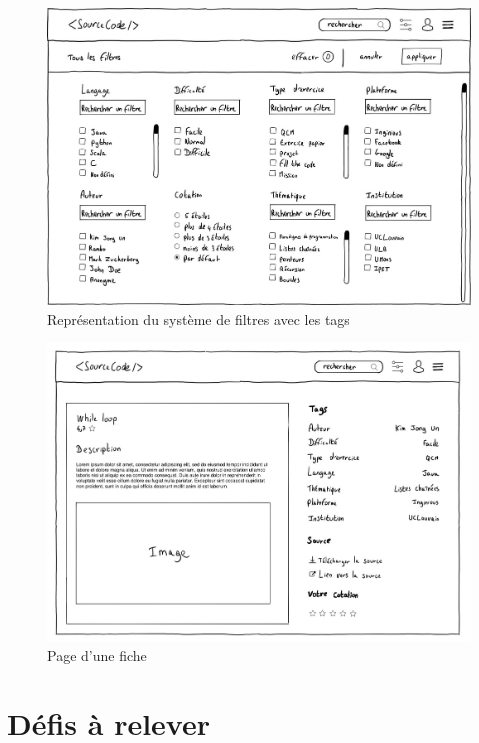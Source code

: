 \begin{figure}[H]
    \includegraphics[width=\textwidth,height=0.4\textheight,keepaspectratio]{images/filters.JPG}
    \centering
    \caption{Représentation du système de filtres avec les \glspl{tag}}
\end{figure}

\begin{figure}[H]
    \includegraphics[width=\textwidth,height=0.4\textheight,keepaspectratio]{images/resource.JPG}
    \centering
    \caption{Page d'une \gls{fiche}}
\end{figure}

\pagebreak
\section{Défis à relever}
\label{section:challengesToDefeat}

